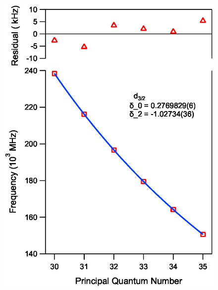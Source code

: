 \documentclass[landscape]{sciposter}
\begin{document}
\begin{multicols}{4}
\begin{figure}
	\begin{center}
		\includegraphics[scale = 0.97]{d32_qd.eps}

\end{center}
\end{figure}
\end{multicols}
\end{document}
